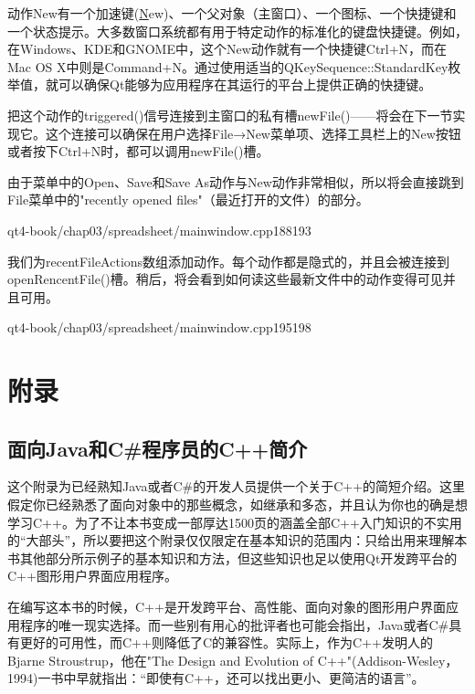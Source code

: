\documentclass[11pt,oneside]{book}
\begin{document}
\begin{common-format}
动作New有一个加速键(\uline{N}ew)、一个父对象（主窗口）、一个图标、一个快捷键和一个状态提示。大多数窗口系统都有用于特定动作的标准化的键盘快捷键。例如，在Windows、KDE和GNOME中，这个New动作就有一个快捷键Ctrl+N，而在Mac OS X中则是Command+N。通过使用适当的QKeySequence::StandardKey枚举值，就可以确保Qt能够为应用程序在其运行的平台上提供正确的快捷键。

把这个动作的triggered()信号连接到主窗口的私有槽newFile()——将会在下一节实现它。这个连接可以确保在用户选择File→New菜单项、选择工具栏上的New按钮或者按下Ctrl+N时，都可以调用newFile()槽。

由于菜单中的Open、Save和Save As动作与New动作非常相似，所以将会直接跳到File菜单中的"recently opened files"（最近打开的文件）的部分。

\begin{cppline}{qt4-book/chap03/spreadsheet/mainwindow.cpp}{188}{193}
\end{cppline}

我们为recentFileActions数组添加动作。每个动作都是隐式的，并且会被连接到openRencentFile()槽。稍后，将会看到如何读这些最新文件中的动作变得可见并且可用。

\begin{cppline}{qt4-book/chap03/spreadsheet/mainwindow.cpp}{195}{198}
\end{cppline}

\appendix

\part{附录}
\chapter{面向Java和C\#{}程序员的C++简介}
这个附录为已经熟知Java或者C\#{}的开发人员提供一个关于C++的简短介绍。这里假定你已经熟悉了面向对象中的那些概念，如继承和多态，并且认为你也的确是想学习C++。为了不让本书变成一部厚达1500页的涵盖全部C++入门知识的不实用的“大部头”，所以要把这个附录仅仅限定在基本知识的范围内：只给出用来理解本书其他部分所示例子的基本知识和方法，但这些知识也足以使用Qt开发跨平台的C++图形用户界面应用程序。

在编写这本书的时候，C++是开发跨平台、高性能、面向对象的图形用户界面应用程序的唯一现实选择。而一些别有用心的批评者也可能会指出，Java或者C\#{}具有更好的可用性，而C++则降低了C的兼容性。实际上，作为C++发明人的Bjarne Stroustrup，他在"The Design and Evolution of C++"(Addison-Wesley，1994)一书中早就指出：“即使有C++，还可以找出更小、更简洁的语言”。


\end{common-format}
\end{document}
